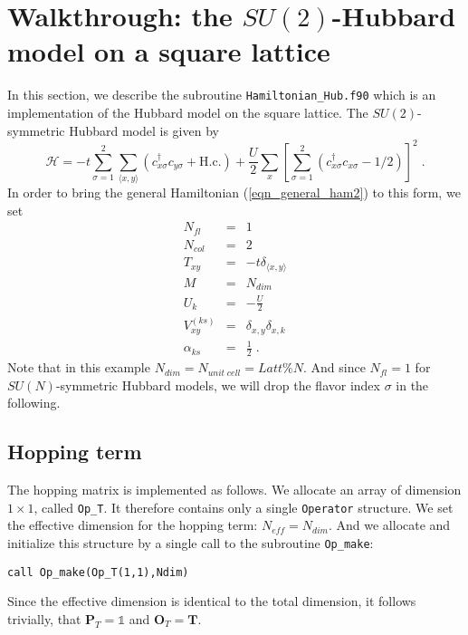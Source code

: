 \section{Walkthrough: the $SU(2)$-Hubbard model on a square lattice}
In this section, we describe the subroutine \texttt{Hamiltonian\_Hub.f90} which is an implementation of the Hubbard model on the square lattice. 
The $SU(2)$-symmetric Hubbard model is given by
\begin{equation}
\label{eqn_hubbard_sun}
\mathcal{H}=
-t\sum\limits_{\sigma=1}^{2} 
\sum\limits_{\langle x,y\rangle} 
\left(c^{\dagger}_{x \sigma} c^{\phantom\dagger}_{y \sigma} + \text{H.c.}
\right)
+ \frac{U}{2}\sum\limits_{x}\left[
\sum\limits_{\sigma=1}^{2}
\left(  c^{\dagger}_{x \sigma} c^{\phantom\dagger}_{x \sigma}  -1/2 \right) \right]^{2}\;.
\end{equation}
In order to bring the general Hamiltonian (\ref{eqn_general_ham2}) to this form, we set
\begin{eqnarray}
N_{fl}         &=&  1 \nonumber\\
N_{col}        &=&  2 \nonumber\\
T_{x y}        &=&  -t\delta_{\langle x,y\rangle} \nonumber\\
M              &=&  N_{dim} \nonumber\\
U_{k}          &=&  -\frac{U}{2} \nonumber\\
V_{x y}^{(ks)} &=&  \delta_{x,y}\delta_{x,k} \nonumber\\
\alpha_{ks}     &=&  \frac{1}{2} \;.
\end{eqnarray}
Note that in this example $N_{dim}=N_{unit\;cell}=Latt\%N$. And since $N_{fl}=1$ for $SU(N)$-symmetric Hubbard models, we will drop the flavor index $\sigma$ in the following.  

\subsection{Hopping term}
The hopping matrix is implemented as follows. 
We allocate an array of dimension $1\times 1$, called \texttt{Op\_T}. It therefore contains only a single \texttt{Operator} structure.
We set the effective dimension for the hopping term: $N_{eff}=N_{dim}$. 
And we allocate and initialize this structure by a single call to the subroutine \texttt{Op\_make}: 
\begin{verbatim}
call Op_make(Op_T(1,1),Ndim)
\end{verbatim}
Since the effective dimension is identical to the total dimension, it follows trivially, that ${\bm P}_{T}=\mathds{1}$ and ${\bm O}_{T}={\bm T}$. 

